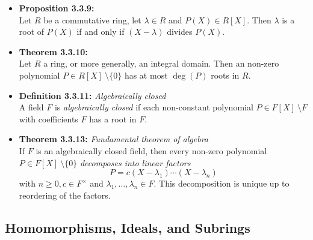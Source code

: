 \documentclass[11pt,a4paper]{article}
\begin{document}
\begin{itemize}
    \item \textbf{Proposition 3.3.9:} \\
        Let $R$ be a commutative ring, let $\lambda \in R$ and $P(X) \in R[X]$.
        Then $\lambda$ is a root of $P(X)$ if and only if $(X-\lambda)$ divides $P(X)$.

    \item \textbf{Theorem 3.3.10:} \\
        Let $R$ a ring, or more generally, an integral domain.
        Then an non-zero polynomial $P \in R[X] \ \setminus \{0\}$ has at most $\deg(P)$ roots in
        $R$.

    \item \textbf{Definition 3.3.11:} \emph{Algebraically closed} \\
        A field $F$ is \emph{algebraically closed} if each non-constant polynomial
        $P \in F[X] \ \setminus F$ with coefficients $F$ has a root in $F$.

    \item \textbf{Theorem 3.3.13:} \emph{Fundamental theorem of algebra} \\
        If $F$ is an algebraically closed field, then every non-zero polynomial
        $P \in F[X] \ \setminus \{0\}$ \emph{decomposes into linear factors}
        \[
            P = c(X - \lambda_1) \cdots (X - \lambda_n)
        \]
        with $n \geq 0, c \in F^\times$ and $\lambda_1, \ldots, \lambda_n \in F$.
        This decomposition is unique up to reordering of the factors.
\end{itemize}

\subsection{Homomorphisms, Ideals, and Subrings}
\end{document}
